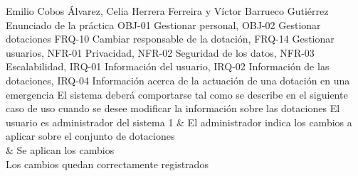 {Emilio Cobos Álvarez, Celia Herrera Ferreira y Víctor Barrueco Gutiérrez}
{Enunciado de la práctica}
{OBJ-01 Gestionar personal, OBJ-02 Gestionar dotaciones}
{FRQ-10 Cambiar responsable de la dotación, FRQ-14 Gestionar usuarios, NFR-01 Privacidad, NFR-02 Seguridad de los datos, NFR-03 Escalabilidad, IRQ-01 Información del usuario, IRQ-02 Información de las dotaciones, IRQ-04 Información acerca de la actuación de una dotación en una emergencia}
{El sistema deberá comportarse tal como se describe en el siguiente caso de uso cuando se desee modificar la información sobre las dotaciones}
{El usuario es administrador del sistema}
{
1 & El administrador indica los cambios a aplicar sobre el conjunto de dotaciones \\  & Se aplican los cambios \\
}
{Los cambios quedan correctamente registrados}
{}

